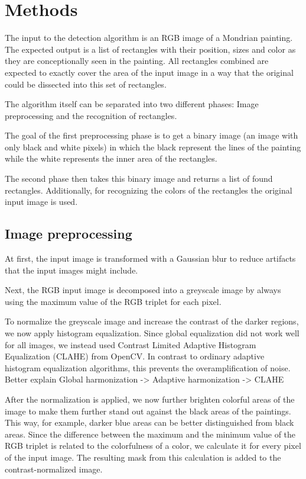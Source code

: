 

\section{Methods}

The input to the detection algorithm is an RGB image of a Mondrian painting. The
expected output is a list of rectangles with their position, sizes and color as
they are conceptionally seen in the painting. All rectangles combined are
expected to exactly cover the area of the input image in a way that the original
could be dissected into this set of rectangles.

The algorithm itself can be separated into two different phases: Image
preprocessing and the recognition of rectangles.

The goal of the first preprocessing phase is to get a binary image (an image
with only black and white pixels) in which the black represent the lines of the
painting while the white represents the inner area of the rectangles.

The second phase then takes this binary image and returns a list of found
rectangles. Additionally, for recognizing the colors of the rectangles the
original input image is used.

\subsection{Image preprocessing}

At first, the input image is transformed with a Gaussian blur to reduce
artifacts that the input images might include.

Next, the RGB input image is decomposed into a greyscale image by always using
the maximum value of the RGB triplet for each pixel.

To normalize the greyscale image and increase the contrast of the darker
regions, we now apply histogram equalization. Since global equalization did not
work well for all images, we instead used Contrast Limited Adaptive Histogram
Equalization (CLAHE) from OpenCV. In contrast to ordinary adaptive histogram
equalization algorithms, this prevents the overamplification of noise. %
Better explain Global harmonization -> Adaptive harmonization -> CLAHE

After the normalization is applied, we now further brighten colorful areas of
the image to make them further stand out against the black areas of the
paintings. This way, for example, darker blue areas can be better distinguished
from black areas. Since the difference between the maximum and the minimum value
of the RGB triplet is related to the colorfulness of a color, we calculate it
for every pixel of the input image. The resulting mask from this calculation is
added to the contrast-normalized image.

